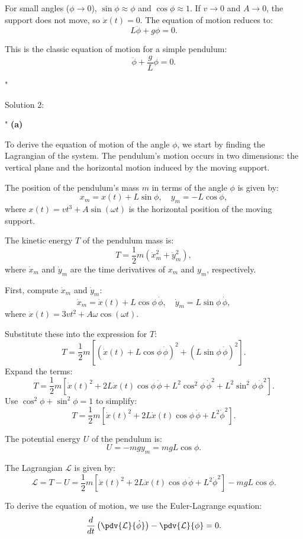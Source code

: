 For small angles ($\phi \to 0$), $\sin\phi \approx \phi$ and $\cos\phi \approx 1$. If $v \to 0$ and $A \to 0$, the support does not move, so $\ddot{x}(t) = 0$. The equation of motion reduces to:
\[
L\ddot{\phi} + g\phi = 0.
\]

This is the classic equation of motion for a simple pendulum:
\[
\boxed{\ddot{\phi} + \frac{g}{L}\phi = 0.}
\]

"

Solution 2: 

"
\textbf{(a)} 

To derive the equation of motion of the angle $\phi$, we start by finding the Lagrangian of the system. The pendulum's motion occurs in two dimensions: the vertical plane and the horizontal motion induced by the moving support. 

The position of the pendulum's mass $m$ in terms of the angle $\phi$ is given by:
\[
x_m = x(t) + L\sin\phi, \quad y_m = -L\cos\phi,
\]
where $x(t) = vt^3 + A\sin(\omega t)$ is the horizontal position of the moving support.

The kinetic energy $T$ of the pendulum mass is:
\[
T = \frac{1}{2}m\left(\dot{x}_m^2 + \dot{y}_m^2\right),
\]
where $\dot{x}_m$ and $\dot{y}_m$ are the time derivatives of $x_m$ and $y_m$, respectively.

First, compute $\dot{x}_m$ and $\dot{y}_m$:
\[
\dot{x}_m = \dot{x}(t) + L\cos\phi\,\dot{\phi}, \quad \dot{y}_m = L\sin\phi\,\dot{\phi},
\]
where $\dot{x}(t) = 3vt^2 + A\omega\cos(\omega t)$.

Substitute these into the expression for $T$:
\[
T = \frac{1}{2}m\left[\left(\dot{x}(t) + L\cos\phi\,\dot{\phi}\right)^2 + \left(L\sin\phi\,\dot{\phi}\right)^2\right].
\]
Expand the terms:
\[
T = \frac{1}{2}m\left[\dot{x}(t)^2 + 2L\dot{x}(t)\cos\phi\,\dot{\phi} + L^2\cos^2\phi\,\dot{\phi}^2 + L^2\sin^2\phi\,\dot{\phi}^2\right].
\]
Use $\cos^2\phi + \sin^2\phi = 1$ to simplify:
\[
T = \frac{1}{2}m\left[\dot{x}(t)^2 + 2L\dot{x}(t)\cos\phi\,\dot{\phi} + L^2\dot{\phi}^2\right].
\]

The potential energy $U$ of the pendulum is:
\[
U = -mg y_m = mgL\cos\phi.
\]

The Lagrangian $\mathcal{L}$ is given by:
\[
\mathcal{L} = T - U = \frac{1}{2}m\left[\dot{x}(t)^2 + 2L\dot{x}(t)\cos\phi\,\dot{\phi} + L^2\dot{\phi}^2\right] - mgL\cos\phi.
\]

To derive the equation of motion, we use the Euler-Lagrange equation:
\[
\frac{d}{dt}\left(\pdv{\mathcal{L}}{\dot{\phi}}\right) - \pdv{\mathcal{L}}{\phi} = 0.
\]

